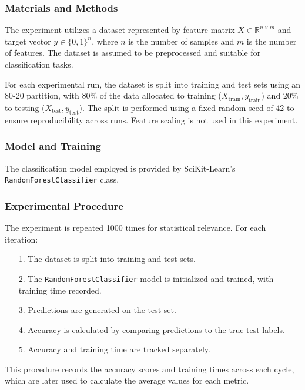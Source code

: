 \documentclass{article}
\theoremstyle{plain}
\theoremstyle{definition}
\theoremstyle{remark}
\begin{document}
\subsubsection{Materials and Methods}

The experiment utilizes a dataset represented by feature matrix $ X \in \mathbb{R}^{n \times m} $ and target vector $ y \in \{0, 1\}^n $, where $ n $ is the number of samples and $ m $ is the number of features. The dataset is assumed to be preprocessed and suitable for classification tasks.

For each experimental run, the dataset is split into training and test sets using an 80-20 partition, with 80\% of the data allocated to training ($ X_{\text{train}}, y_{\text{train}} $) and 20\% to testing ($ X_{\text{test}}, y_{\text{test}} $). The split is performed using a fixed random seed of 42 to ensure reproducibility across runs. Feature scaling is not used in this experiment.


\subsubsection{Model and Training}

The classification model employed is provided by SciKit-Learn's \texttt{RandomForestClassifier} class.


\subsubsection{Experimental Procedure}

The experiment is repeated 1000 times for statistical relevance. For each iteration:

\begin{itemize}
	\item [1.] The dataset is split into training and test sets.
	\item [2.] The \texttt{RandomForestClassifier} model is initialized and trained, with training time recorded.
	\item [3.] Predictions are generated on the test set.
	\item [4.] Accuracy is calculated by comparing predictions to the true test labels.
	\item [5.] Accuracy and training time are tracked separately.
\end{itemize}

This procedure records the accuracy scores and training times across each cycle, which are later used to calculate the average values for each metric.
\end{document}
